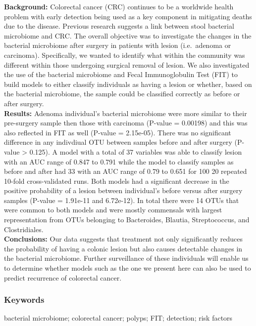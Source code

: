 \documentclass[12pt,]{article}
\begin{document}
\textbf{Background:} Colorectal cancer (CRC) continues to be a worldwide
health problem with early detection being used as a key component in
mitigating deaths due to the disease. Previous research suggests a link
between stool bacterial microbiome and CRC. The overall objective was to
investigate the changes in the bacterial microbiome after surgery in
patients with lesion (i.e.~adenoma or carcinoma). Specifically, we
wanted to identify what within the community was different within those
undergoing surgical removal of lesion. We also investigated the use of
the bacterial microbiome and Fecal Immunoglobulin Test (FIT) to build
models to either classify individuals as having a lesion or whether,
based on the bacterial microbiome, the sample could be classified
correctly as before or after surgery.\\
\textbf{Results:} Adenoma individual's bacterial microbiome were more
similar to their pre-surgery sample then those with carcinoma (P-value =
0.00198) and this was also reflected in FIT as well (P-value =
2.15e-05). There was no significant difference in any indivdiual OTU
between samples before and after surgery (P-value \textgreater{} 0.125).
A model with a total of 37 variables was able to classify lesion with an
AUC range of 0.847 to 0.791 while the model to classify samples as
before and after had 33 with an AUC range of 0.79 to 0.651 for 100 20
repeated 10-fold cross-validated runs. Both models had a significant
decrease in the positive probability of a lesion between individual's
before versus after surgery samples (P-value = 1.91e-11 and 6.72e-12).
In total there were 14 OTUs that were common to both models and were
mostly commensals with largest representation from OTUs belonging to
Bacteroides, Blautia, Streptococcus, and Clostridiales.\\
\textbf{Conclusions:} Our data suggests that treatment not only
significantly reduces the probability of having a colonic lesion but
also causes detectable changes in the bacterial microbiome. Further
surveillance of these individuals will enable us to determine whether
models such as the one we present here can also be used to predict
recurrence of colorectal cancer.

\newpage

\subsubsection{Keywords}\label{keywords}

bacterial microbiome; colorectal cancer; polyps; FIT; detection; risk
factors
\end{document}
